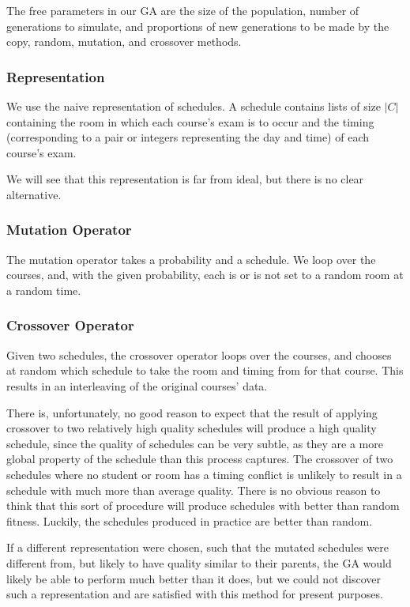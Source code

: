 \documentclass[letterpaper]{article}
\begin{document}
      The free parameters in our GA are the size of the population, number of
      generations to simulate, and proportions of new generations to be made by the copy, 
      random, mutation, and crossover methods.
      
    \subsubsection{Representation}
      We use the naive representation of schedules. A schedule contains lists of size $|C|$
      containing the room in which each course's exam is to occur and the timing
      (corresponding to a pair or integers representing the day and time) of each course's
      exam.
      
      We will see that this representation is far from ideal, but there is no clear alternative.
      
    \subsubsection{Mutation Operator}
      The mutation operator takes a probability and a schedule. We loop over the courses,
      and, with the given probability, each is or is not set to a random room at a random time.
      
    \subsubsection{Crossover Operator}
      Given two schedules, the crossover operator loops over the courses, and chooses at
      random which schedule to take the room and timing from for that course. This results 
      in an interleaving of the original courses' data.
      
      There is, unfortunately, no good reason to expect that the result of applying 
      crossover to two relatively high quality schedules will produce a high quality 
      schedule, since the quality of schedules can be very subtle, as they are a more 
      global property of the schedule than this process captures. The crossover of two 
      schedules where no student or room has a timing conflict is unlikely to result in 
      a schedule with much more than average quality. There is no obvious reason to think 
      that this sort of procedure will produce schedules with better than random fitness. 
      Luckily, the schedules produced in practice are better than random.
      
      If a different representation were chosen, such that the mutated schedules were
      different from, but likely to have quality similar to their parents, the GA would 
      likely be able to perform much better than it does, but we could not discover such a
      representation and are satisfied with this method for present purposes.
      
\end{document}
